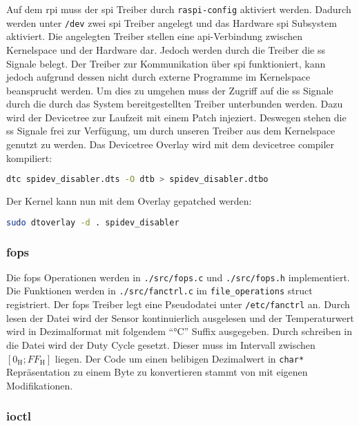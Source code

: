 Auf dem \gls{rpi} muss der \gls{spi} Treiber durch \texttt{raspi-config} aktiviert werden.
Dadurch werden unter \texttt{/dev} zwei \gls{spi} Treiber angelegt und das Hardware \gls{spi} Subsystem aktiviert.
Die angelegten Treiber stellen eine \gls{api}-Verbindung zwischen Kernelspace und der Hardware dar.
Jedoch werden durch die Treiber die \gls{ss} Signale belegt.
Der Treiber zur Kommunikation über \gls{spi} funktioniert, kann jedoch aufgrund dessen nicht durch externe Programme im Kernelspace beansprucht werden.
Um dies zu umgehen muss der Zugriff auf die \gls{ss} Signale durch die durch das System bereitgestellten Treiber unterbunden werden.
Dazu wird der Devicetree zur Laufzeit mit einem Patch injeziert.
Deswegen stehen die \gls{ss} Signale frei zur Verfügung, um durch unseren Treiber aus dem Kernelspace genutzt zu werden.
Das Devicetree Overlay wird mit dem devicetree compiler kompiliert:
\begin{lstlisting}[language=bash, numbers=none]
dtc spidev_disabler.dts -O dtb > spidev_disabler.dtbo
\end{lstlisting}
\noindent
Der Kernel kann nun mit dem Overlay gepatched werden:
\begin{lstlisting}[language=bash, numbers=none]
sudo dtoverlay -d . spidev_disabler
\end{lstlisting}

\subsubsection{\acrshort{fops}}

Die \gls{fops} Operationen werden in \texttt{./src/fops.c} und \texttt{./src/fops.h} implementiert.
Die Funktionen werden in \texttt{./src/fanctrl.c} im \texttt{file\_operations} struct registriert.
Der \gls{fops} Treiber legt eine Pseudodatei unter \texttt{/etc/fanctrl} an.
Durch lesen der Datei wird der Sensor kontinuierlich ausgelesen und der Temperaturwert wird in Dezimalformat mit folgendem \enquote{\si{\celsius}} Suffix ausgegeben.
Durch schreiben in die Datei wird der Duty Cycle gesetzt.
Dieser muss im Intervall zwischen $\left[0_{\text{H}}; FF_{\text{H}}\right]$ liegen.
Der Code um einen belibigen Dezimalwert in \texttt{char*} Repräsentation zu einem Byte zu konvertieren stammt von \autocite{toUint} mit eigenen Modifikationen.

\subsubsection{\Acrshort{ioctl}}

